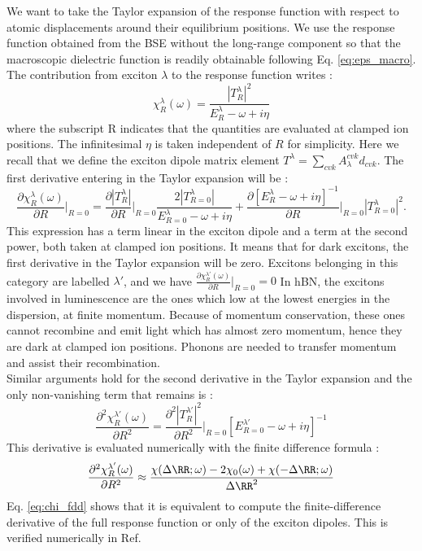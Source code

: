 We want to take the Taylor expansion of the response function with respect to atomic displacements around their equilibrium positions. We use the response function obtained from the \acrshort{BSE} without the long-range component so that the macroscopic dielectric function is readily obtainable following Eq. \eqref{eq:eps_macro}.
The contribution from exciton $\lambda$ to the response function  writes :
\begin{equation}
	\chi^\lambda_R(\omega) = \frac{|T^\lambda_R|^2}{E^\lambda_R - \omega + i \eta}
\end{equation}
where the subscript R indicates that the quantities are evaluated at clamped ion positions. The infinitesimal $\eta$ is taken independent of $R$ for simplicity. Here we recall that we define the exciton dipole matrix element $T^\lambda = \sum_{cvk} A_\lambda^{cvk} d_{cvk}$. The first derivative entering in the Taylor expansion will be :
\begin{equation}
	\frac{\partial \chi^\lambda_R(\omega)}{\partial R}\biggr|_{R=0} = \frac{\partial |T^\lambda_R|}{\partial R}\biggr|_{R=0} \frac{2|T^\lambda_{R=0}|}{E^\lambda_{R=0} - \omega + i\eta} + \frac{\partial \left[ E^\lambda_R - \omega + i\eta \right]^{-1}}{\partial R}\biggr|_{R=0} |T^\lambda_{R=0}|^2.
\end{equation}
This expression has a term linear in the exciton dipole and a term at the second power, both taken at clamped ion positions. It means that for dark excitons, the first derivative in the Taylor expansion will be zero. Excitons belonging in this category are labelled $\lambda'$, and we have $\frac{\partial \chi^{\lambda'}_R(\omega)}{\partial R}\bigr|_{R=0} = 0$
In \acrshort{hBN}, the excitons involved in luminescence are the ones which low at the lowest energies in the dispersion, at finite momentum. Because of momentum conservation, these ones cannot recombine and emit light which has almost zero momentum, hence they are dark at clamped ion positions. Phonons are needed to transfer momentum and assist their recombination. \\ 
Similar arguments hold for the second derivative in the Taylor expansion
and the only non-vanishing term that remains is :
\begin{equation}
	\frac{\partial^2 \chi^{\lambda'}_R(\omega)}{\partial R^2} = \frac{\partial^2 |T^{\lambda'}_R|^2}{\partial R^2}\biggr|_{R=0} \left[ E^{\lambda'}_{R=0} - \omega + i\eta \right]^{-1} \label{eq:chi_fdd}
\end{equation}
This derivative is evaluated numerically with the finite difference formula :
\begin{equation}
	\frac{\partial^2 \chi^{\lambda'}_R(\omega)}{\partial R^2} \approx \frac{\chi(\Delta\RR;\omega) - 2 \chi_0(\omega) + \chi(-\Delta\RR;\omega)}{\Delta\RR^2}
\end{equation}
Eq. \eqref{eq:chi_fdd} shows that it is equivalent to compute the finite-difference derivative of the full response function or only of the exciton dipoles. This is verified numerically in Ref. \cite{paleari2019exciton}

